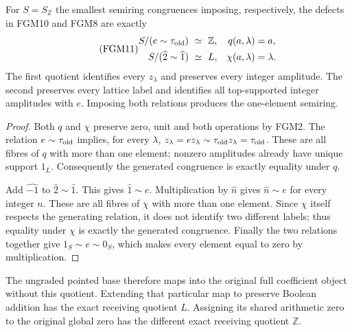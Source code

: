\begin{theorem}
For $S=S_{\mathbb Z}$ the smallest semiring congruences imposing,
respectively, the defects in FGM10 and FGM8 are exactly
\begin{equation}\tag{FGM11}
 \begin{aligned}
 S/(e\sim\tau_{\rm old})&\ \simeq\ \mathbb Z,
 &q(a,\lambda)&=a,\\
 S/(\widehat2\sim\widehat1)&\ \simeq\ L,
 &\chi(a,\lambda)&=\lambda.
 \end{aligned}
\end{equation}
The first quotient identifies every $z_\lambda$ and preserves every
integer amplitude. The second preserves every lattice label and
identifies all top-supported integer amplitudes with $e$. Imposing
both relations produces the one-element semiring.
\end{theorem}
\begin{proof}
Both $q$ and $\chi$ preserve zero, unit and both operations by FGM2.
The relation $e\sim\tau_{\rm old}$ implies, for every $\lambda$,
$z_\lambda=e z_\lambda\sim\tau_{\rm old}z_\lambda
=\tau_{\rm old}$. These are all fibres of $q$ with more than one
element; nonzero amplitudes already have unique support $1_L$.
Consequently the generated congruence is exactly equality under $q$.

Add $\widehat{-1}$ to $\widehat2\sim\widehat1$. This gives
$\widehat1\sim e$. Multiplication by $\widehat n$ gives
$\widehat n\sim e$ for every integer $n$. These are all fibres
of $\chi$ with more than one element. Since $\chi$ itself respects
the generating relation, it does not identify two different labels;
thus equality under $\chi$ is exactly the generated congruence.
Finally the two relations together give $1_S\sim e\sim0_S$,
which makes every element equal to zero by multiplication.
\end{proof}
The ungraded pointed base therefore maps into the original full
coefficient object without this quotient. Extending that particular
map to preserve Boolean addition has the exact receiving quotient $L$.
Assigning its shared arithmetic zero to the original global zero has
the different exact receiving quotient $\mathbb Z$.

